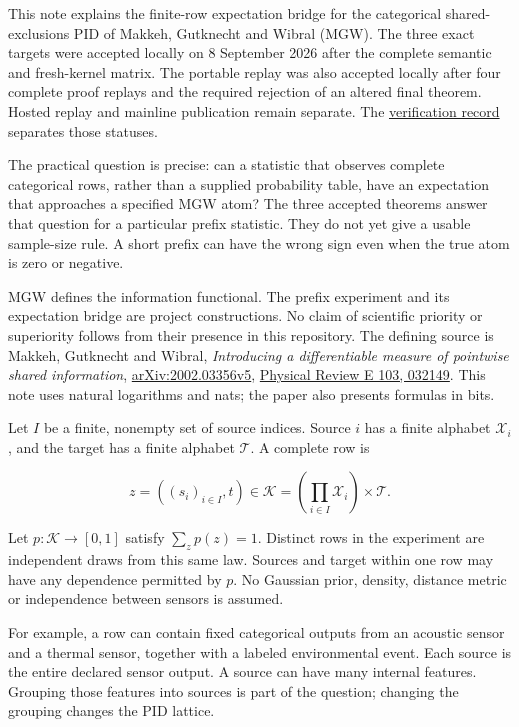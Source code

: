This note explains the finite-row expectation bridge for the categorical shared-exclusions PID of Makkeh, Gutknecht and Wibral (MGW). The three exact targets were accepted locally on 8 September 2026 after the complete semantic and fresh-kernel matrix. The portable replay was also accepted locally after four complete proof replays and the required rejection of an altered final theorem. Hosted replay and mainline publication remain separate. The \href{../../audit/evidence/prefix-mgw-mean-formal-verification-2026-09-08/RESULTS.md}{verification record} separates those statuses.

The practical question is precise: can a statistic that observes complete categorical rows, rather than a supplied probability table, have an expectation that approaches a specified MGW atom? The three accepted theorems answer that question for a particular prefix statistic. They do not yet give a usable sample-size rule. A short prefix can have the wrong sign even when the true atom is zero or negative.

MGW defines the information functional. The prefix experiment and its expectation bridge are project constructions. No claim of scientific priority or superiority follows from their presence in this repository. The defining source is Makkeh, Gutknecht and Wibral, \emph{Introducing a differentiable measure of pointwise shared information}, \href{https://arxiv.org/abs/2002.03356v5}{arXiv:2002.03356v5}, \href{https://doi.org/10.1103/PhysRevE.103.032149}{Physical Review E 103, 032149}. This note uses natural logarithms and nats; the paper also presents formulas in bits.

\label{data-law-and-information-question}

Let \(I\) be a finite, nonempty set of source indices. Source \(i\) has a finite alphabet \(\mathcal X_i\), and the target has a finite alphabet \(\mathcal T\). A complete row is

\[
z=((s_i)_{i\in I},t)\in\mathcal K
   =\left(\prod_{i\in I}\mathcal X_i\right)\times\mathcal T.
\]

Let \(p:\mathcal K\to[0,1]\) satisfy \(\sum_zp(z)=1\). Distinct rows in the experiment are independent draws from this same law. Sources and target within one row may have any dependence permitted by \(p\). No Gaussian prior, density, distance metric or independence between sensors is assumed.

For example, a row can contain fixed categorical outputs from an acoustic sensor and a thermal sensor, together with a labeled environmental event. Each source is the entire declared sensor output. A source can have many internal features. Grouping those features into sources is part of the question; changing the grouping changes the PID lattice.

